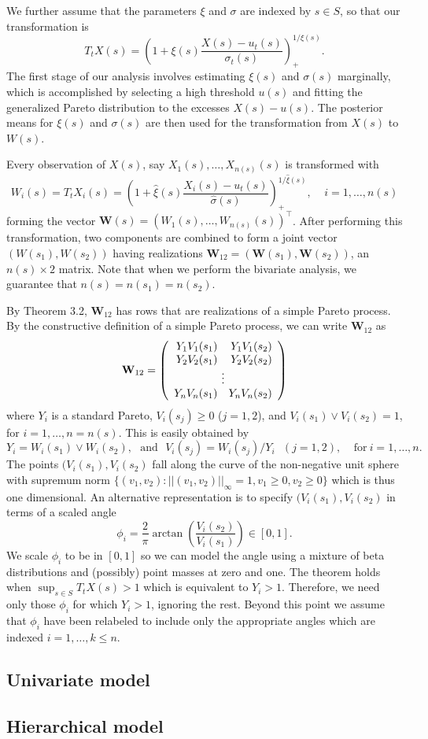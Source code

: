 \documentclass[12pt]{article}
\newcommand{\m}[1]{\mathbf{\bm{#1}}}
\begin{document}
We further assume that the parameters $\xi$ and $\sigma$ are indexed by $s\in S$, so that our transformation is
\[ T_t X(s) = \left(1 + \xi(s) \frac{X(s) - u_t(s)}{\sigma_t(s)}\right)_+^{1/\xi(s)}. \]
The first stage of our analysis involves estimating $\xi(s)$ and $\sigma(s)$ marginally, which is accomplished by selecting a high threshold $u(s)$ and fitting the generalized Pareto distribution to the excesses $X(s)-u(s)$. The posterior means for $\xi(s)$ and $\sigma(s)$ are then used for the transformation from $X(s)$ to $W(s)$.
\bigskip

Every observation of $X(s)$, say $X_1(s),\ldots,X_{n(s)}(s)$ is transformed with
\[ W_i(s) = T_t X_i(s) = \left(1 + \hat{\xi}(s) \frac{X_i(s) - u_t(s)}{\hat{\sigma}(s)}\right)_+^{1/\hat{\xi}(s)},~~~~~i=1,\ldots,n(s) \]
forming the vector $\m{W}(s)=(W_1(s),\ldots,W_{n(s)}(s))^\top$. After performing this transformation, two components are combined to form a joint vector $(W(s_1), W(s_2))$ having realizations $\m{W}_{12}=(\m{W}(s_1), \m{W}(s_2))$, an $n(s)\times 2$ matrix. Note that when we perform the bivariate analysis, we guarantee that $n(s)=n(s_1)=n(s_2)$.
\bigskip

By Theorem 3.2, $\m{W}_{12}$ has rows that are realizations of a simple Pareto process. By the constructive definition of a simple Pareto process, we can write $\m{W}_{12}$ as
\[ \m{W}_{12} = \left(\begin{array}{rr} Y_1V_1(s_1) & Y_1V_1(s_2) \\ Y_2V_2(s_1) & Y_2V_2(s_2) \\ \multicolumn{2}{c}{\vdots} \\ Y_nV_n(s_1) & Y_nV_n(s_2) \end{array}\right) \]
where $Y_i$ is a standard Pareto, $V_i(s_j)\geq 0$ ($j=1,2$), and $V_i(s_1) \vee V_i(s_2) = 1$, for $i=1,\ldots,n=n(s)$. This is easily obtained by
\[ Y_i = W_i(s_1) \vee W_i(s_2),~~~\mathrm{and}~~~ V_i(s_j) = W_i(s_j) / Y_i ~~~ (j=1,2),~~~~~\mathrm{for~}i=1,\ldots,n. \]
The points $(V_i(s_1), V_i(s_2)$ fall along the curve of the non-negative unit sphere with supremum norm $\{(v_1, v_2):||(v_1,v_2)||_\infty=1, v_1\geq0,v_2\geq0\}$ which is thus one dimensional. An alternative representation is to specify $(V_i(s_1), V_i(s_2)$ in terms of a scaled angle
\[ \phi_i = \frac{2}{\pi}\arctan\left(\frac{V_i(s_2)}{V_i(s_1)}\right)\in[0,1]. \]
We scale $\phi_i$ to be in $[0,1]$ so we can model the angle using a mixture of beta distributions and (possibly) point masses at zero and one. The theorem holds when $\sup_{s\in S}T_t X(s) > 1$ which is equivalent to $Y_i > 1$. Therefore, we need only those $\phi_i$ for which $Y_i>1$, ignoring the rest. Beyond this point we assume that $\phi_i$ have been relabeled to include only the appropriate angles which are indexed $i=1,\ldots,k\leq n$.

\subsection*{Univariate model}

\subsection*{Hierarchical model}



\end{document}
